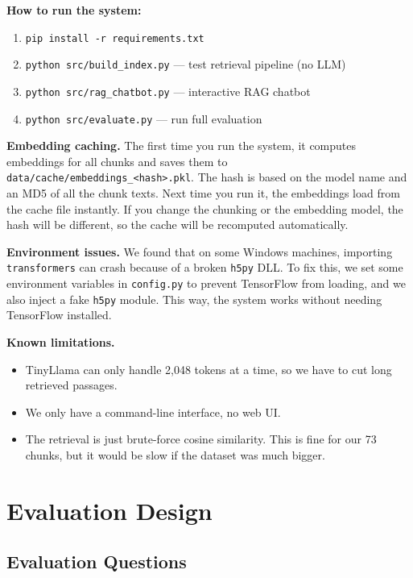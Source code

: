 \documentclass[10pt,conference]{IEEEtran}
\begin{document}
\textbf{How to run the system:}
\begin{enumerate}
    \item \texttt{pip install -r requirements.txt}
    \item \texttt{python src/build\_index.py} --- test retrieval pipeline (no LLM)
    \item \texttt{python src/rag\_chatbot.py} --- interactive RAG chatbot
    \item \texttt{python src/evaluate.py} --- run full evaluation
\end{enumerate}

\textbf{Embedding caching.} The first time you run the system, it computes embeddings for all chunks and saves them to \texttt{data/cache/embeddings\_<hash>.pkl}. The hash is based on the model name and an MD5 of all the chunk texts. Next time you run it, the embeddings load from the cache file instantly. If you change the chunking or the embedding model, the hash will be different, so the cache will be recomputed automatically.

\textbf{Environment issues.} We found that on some Windows machines, importing \texttt{transformers} can crash because of a broken \texttt{h5py} DLL. To fix this, we set some environment variables in \texttt{config.py} to prevent TensorFlow from loading, and we also inject a fake \texttt{h5py} module. This way, the system works without needing TensorFlow installed.

\textbf{Known limitations.}
\begin{itemize}
    \item TinyLlama can only handle 2,048 tokens at a time, so we have to cut long retrieved passages.
    \item We only have a command-line interface, no web UI.
    \item The retrieval is just brute-force cosine similarity. This is fine for our 73 chunks, but it would be slow if the dataset was much bigger.
\end{itemize}

\section{Evaluation Design}
\label{sec:evaluation-design}

\subsection{Evaluation Questions}
\end{document}
